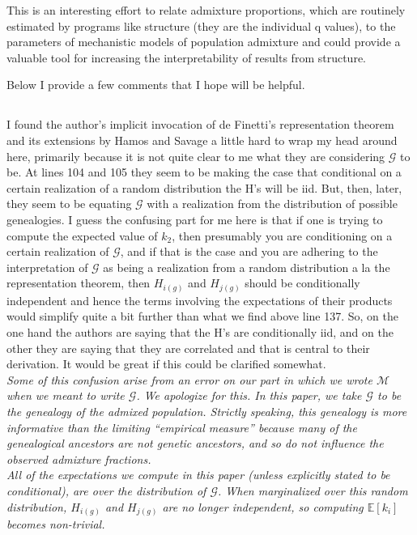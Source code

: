 \documentclass[11pt]{amsart}
\begin{document}
This is an interesting effort to relate admixture proportions, which are routinely estimated by programs
like structure (they are the individual q values), to the parameters of mechanistic models of population
admixture and could provide a valuable tool for increasing the interpretability of results from structure.

Below I provide a few comments that I hope will be helpful.

\subsection{} I found the author's implicit invocation of de Finetti's representation theorem and its extensions by Hamos and Savage a little hard to wrap my head around here, primarily because it is not quite clear to me what they are considering $\mathcal{G}$ to be. 
At lines 104 and 105 they seem to be making the case that conditional on a certain realization of a random distribution the H's will be iid. 
But, then, later, they seem to be equating $\mathcal{G}$ with a realization from the distribution of possible genealogies. 
I guess the confusing part for me here is that if one is trying to compute the expected value of $k_2$, then presumably you are conditioning on a certain realization of $\mathcal{G}$, 
and if that is the case and you are adhering to
the interpretation of $\mathcal{G}$ as being a realization from a random distribution a la the representation theorem, 
then $H_{i(g)}$ and $H_{j(g)}$ should be conditionally independent and hence the terms involving the
expectations of their products would simplify quite a bit further than what we find above line 137. 
So, on the one hand the authors are saying that the H's are conditionally iid, and on the other they are saying that they are correlated and that is central to their derivation. 
It would be great if this could be clarified somewhat.\\
\textit{
	\indent
	Some of this confusion arise from an error on our part in which we wrote $\mathcal{M}$ when we meant to write $\mathcal{G}$.
	We apologize for this.
	In this paper, we take $\mathcal{G}$ to be the genealogy of the admixed population.
	Strictly speaking, this genealogy is more informative than the limiting ``empirical measure'' because many of the genealogical ancestors are not genetic ancestors, and so do not influence the observed admixture fractions. \\
	\indent 
	All of the expectations we compute in this paper (unless explicitly stated to be conditional), are over the distribution of $\mathcal{G}$. When marginalized over this random distribution, $H_{i(g)}$ and $H_{j(g)}$ are no longer independent, so computing $\mathbb{E}[k_i]$ becomes non-trivial.
}
\end{document}
